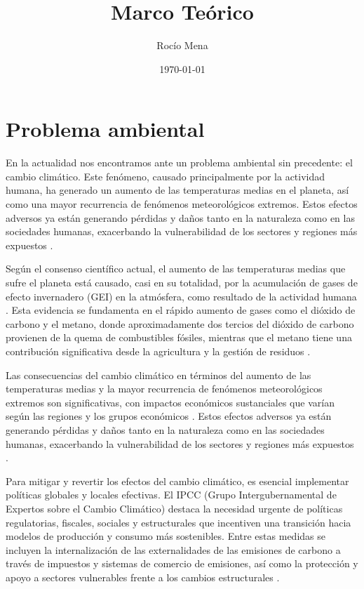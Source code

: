 \documentclass[main.tex]{subfiles}
\title{Marco Teórico}
\author{Rocío Mena}
\date{\today}
\begin{document}
\maketitle

\section{Problema ambiental}

En la actualidad nos encontramos ante un problema ambiental sin precedente: el cambio climático. Este fenómeno, causado principalmente por la actividad humana, ha generado un aumento de las temperaturas medias en el planeta, así como una mayor recurrencia de fenómenos meteorológicos extremos. Estos efectos adversos ya están generando pérdidas y daños tanto en la naturaleza como en las sociedades humanas, exacerbando la vulnerabilidad de los sectores y regiones más expuestos \cite{clima2022book}. 

Según el consenso científico actual, el aumento de las temperaturas medias que sufre el planeta está causado, casi en su totalidad, por la acumulación de gases de efecto invernadero (GEI) en la atmósfera, como resultado de la actividad humana \cite{IPCC2022}. Esta evidencia se fundamenta en el rápido aumento de gases como el dióxido de carbono y el metano, donde aproximadamente dos tercios del dióxido de carbono provienen de la quema de combustibles fósiles, mientras que el metano tiene una contribución significativa desde la agricultura y la gestión de residuos \cite{pelegri2021ipcc}.

Las consecuencias del cambio climático en términos del aumento de las temperaturas medias y la mayor recurrencia de fenómenos meteorológicos extremos son significativas, con impactos económicos sustanciales que varían según las regiones y los grupos económicos \cite{IPCC2022}. Estos efectos adversos ya están generando pérdidas y daños tanto en la naturaleza como en las sociedades humanas, exacerbando la vulnerabilidad de los sectores y regiones más expuestos \cite{pelegri2021ipcc}.

Para mitigar y revertir los efectos del cambio climático, es esencial implementar políticas globales y locales efectivas. El IPCC (Grupo Intergubernamental de Expertos sobre el Cambio Climático) destaca la necesidad urgente de políticas regulatorias, fiscales, sociales y estructurales que incentiven una transición hacia modelos de producción y consumo más sostenibles. Entre estas medidas se incluyen la internalización de las externalidades de las emisiones de carbono a través de impuestos y sistemas de comercio de emisiones, así como la protección y apoyo a sectores vulnerables frente a los cambios estructurales \cite{IPCC2022}.
\end{document}
